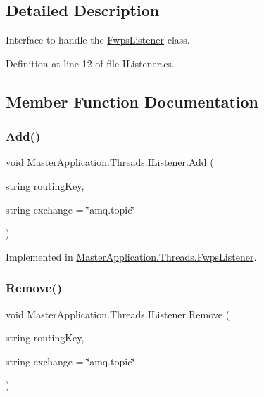 \subsection{Detailed Description}
Interface to handle the \mbox{\hyperlink{class_master_application_1_1_threads_1_1_fwps_listener}{Fwps\+Listener}} class. 

Definition at line 12 of file I\+Listener.\+cs.



\subsection{Member Function Documentation}
\mbox{\label{interface_master_application_1_1_threads_1_1_i_listener_ae5d4878084f5003f98f99a5a3e4b5ec8}} 
\subsubsection{\texorpdfstring{Add()}{Add()}}
{\footnotesize\ttfamily void Master\+Application.\+Threads.\+I\+Listener.\+Add (\begin{DoxyParamCaption}\item[{string}]{routing\+Key,  }\item[{string}]{exchange = {\ttfamily \char`\"{}amq.topic\char`\"{}} }\end{DoxyParamCaption})}



Implemented in \mbox{\hyperlink{class_master_application_1_1_threads_1_1_fwps_listener_ae19201bd86b5f5d21b6d140794ecbdbc}{Master\+Application.\+Threads.\+Fwps\+Listener}}.

\mbox{\label{interface_master_application_1_1_threads_1_1_i_listener_a1bf04b1440221f92c0ba0f3f674d4bce}} 
\subsubsection{\texorpdfstring{Remove()}{Remove()}}
{\footnotesize\ttfamily void Master\+Application.\+Threads.\+I\+Listener.\+Remove (\begin{DoxyParamCaption}\item[{string}]{routing\+Key,  }\item[{string}]{exchange = {\ttfamily \char`\"{}amq.topic\char`\"{}} }\end{DoxyParamCaption})}



